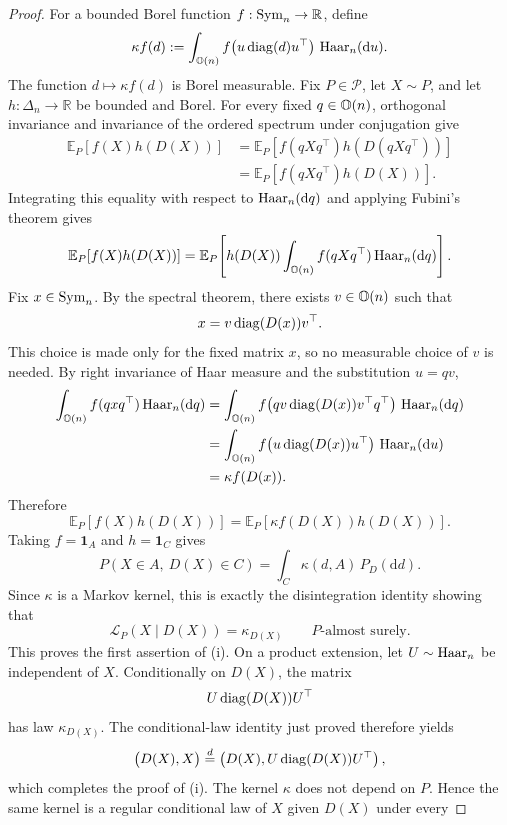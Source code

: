 \begin{proof}
For a bounded Borel function \(f:\mathrm{Sym}_n\to\mathbb R\), define
\[
\kappa f(d)
:=
\int_{\mathbb{O}(n)}
f\!\left(u\operatorname{diag}(d)u^\top\right)\,\mathrm{Haar}_n(\mathrm{d}u).
\]
The function \(d\mapsto\kappa f(d)\) is Borel measurable.
Fix \(P\in\mathcal P\), let \(X\sim P\), and let
\(h:\Delta_n\to\mathbb R\) be bounded and Borel. For every fixed
\(q\in\mathbb{O}(n)\), orthogonal invariance and invariance of the ordered
spectrum under conjugation give
\[
\begin{aligned}
\mathbb E_P\!\left[f(X)h(D(X))\right]
&=
\mathbb E_P\!\left[
f(qXq^\top)h(D(qXq^\top))
\right] \\
&=
\mathbb E_P\!\left[
f(qXq^\top)h(D(X))
\right].
\end{aligned}
\]
Integrating this equality with respect to \(\mathrm{Haar}_n(\mathrm{d}q)\)
and applying Fubini's theorem gives
\[
\mathbb E_P\!\left[f(X)h(D(X))\right]
=
\mathbb E_P\!\left[
h(D(X))
\int_{\mathbb{O}(n)}
f(qXq^\top)\,\mathrm{Haar}_n(\mathrm{d}q)
\right].
\]
Fix \(x\in\mathrm{Sym}_n\). By the spectral theorem, there exists
\(v\in\mathbb{O}(n)\) such that
\[
x=v\operatorname{diag}(D(x))v^\top.
\]
This choice is made only for the fixed matrix \(x\), so no measurable
choice of \(v\) is needed. By right invariance of Haar measure and the
substitution \(u=qv\),
\[
\begin{aligned}
\int_{\mathbb{O}(n)}f(qxq^\top)\,\mathrm{Haar}_n(\mathrm{d}q)
&=
\int_{\mathbb{O}(n)}
f\!\left(
qv\operatorname{diag}(D(x))v^\top q^\top
\right)\,\mathrm{Haar}_n(\mathrm{d}q) \\
&=
\int_{\mathbb{O}(n)}
f\!\left(
u\operatorname{diag}(D(x))u^\top
\right)\,\mathrm{Haar}_n(\mathrm{d}u) \\
&=
\kappa f(D(x)).
\end{aligned}
\]
Therefore
\[
\mathbb E_P\!\left[f(X)h(D(X))\right]
=
\mathbb E_P\!\left[
\kappa f(D(X))h(D(X))
\right].
\]
Taking \(f=\mathbf 1_A\) and \(h=\mathbf 1_C\) gives
\[
P\!\left(X\in A,\ D(X)\in C\right)
=
\int_C\kappa(d,A)\,P_D(\mathrm{d}d).
\]
Since \(\kappa\) is a Markov kernel, this is exactly the
disintegration identity showing that
\[
\mathcal L_P(X\mid D(X))
=
\kappa_{D(X)}
\qquad P\text{-almost surely}.
\]
This proves the first assertion of (i).
On a product extension, let \(U\sim\mathrm{Haar}_n\) be independent of \(X\).
Conditionally on \(D(X)\), the matrix
\[
U\operatorname{diag}(D(X))U^\top
\]
has law \(\kappa_{D(X)}\). The conditional-law identity just
proved therefore yields
\[
\bigl(D(X),X\bigr)
\overset{d}{=}
\left(
D(X),
U\operatorname{diag}(D(X))U^\top
\right),
\]
which completes the proof of (i).
The kernel \(\kappa\) does not depend on \(P\). Hence the same kernel
is a regular conditional law of \(X\) given \(D(X)\) under every

\end{proof}
